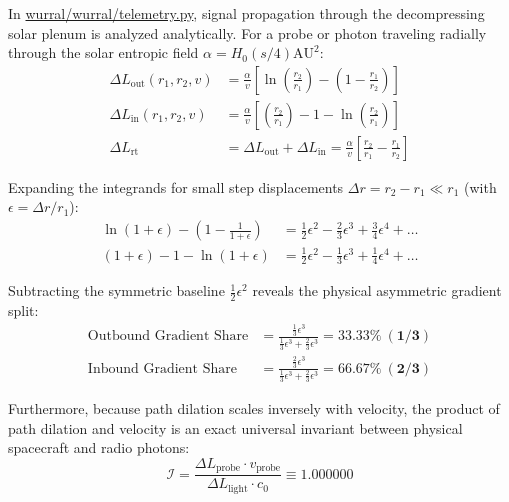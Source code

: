 \documentclass[11pt,a4paper]{article}
\begin{document}
In \url{wurral/wurral/telemetry.py}, signal propagation through the decompressing solar plenum is analyzed analytically. For a probe or photon traveling radially through the solar entropic field $\alpha = H_0 (s/4) \text{AU}^2$:
\begin{align}
\Delta L_{\text{out}}(r_1, r_2, v) &= \frac{\alpha}{v} \left[ \ln\left(\frac{r_2}{r_1}\right) - \left(1 - \frac{r_1}{r_2}\right) \right] \label{eq:l_out} \\
\Delta L_{\text{in}}(r_1, r_2, v) &= \frac{\alpha}{v} \left[ \left(\frac{r_2}{r_1}\right) - 1 - \ln\left(\frac{r_2}{r_1}\right) \right] \label{eq:l_in} \\
\Delta L_{\text{rt}} &= \Delta L_{\text{out}} + \Delta L_{\text{in}} = \frac{\alpha}{v} \left[ \frac{r_2}{r_1} - \frac{r_1}{r_2} \right] \label{eq:l_rt}
\end{align}

Expanding the integrands for small step displacements $\Delta r = r_2 - r_1 \ll r_1$ (with $\epsilon = \Delta r / r_1$):
\begin{align}
\ln(1 + \epsilon) - \left(1 - \frac{1}{1 + \epsilon}\right) &= \frac{1}{2}\epsilon^2 - \frac{2}{3}\epsilon^3 + \frac{3}{4}\epsilon^4 + \dots \\
(1 + \epsilon) - 1 - \ln(1 + \epsilon) &= \frac{1}{2}\epsilon^2 - \frac{1}{3}\epsilon^3 + \frac{1}{4}\epsilon^4 + \dots
\end{align}

Subtracting the symmetric baseline $\frac{1}{2}\epsilon^2$ reveals the physical asymmetric gradient split:
\begin{align}
\text{Outbound Gradient Share} &= \frac{\frac{1}{3}\epsilon^3}{\frac{1}{3}\epsilon^3 + \frac{2}{3}\epsilon^3} = \mathbf{33.33\% \ (1/3)} \label{eq:outbound_share} \\
\text{Inbound Gradient Share} &= \frac{\frac{2}{3}\epsilon^3}{\frac{1}{3}\epsilon^3 + \frac{2}{3}\epsilon^3} = \mathbf{66.67\% \ (2/3)} \label{eq:inbound_share}
\end{align}

Furthermore, because path dilation scales inversely with velocity, the product of path dilation and velocity is an exact universal invariant between physical spacecraft and radio photons:
\begin{equation}
\mathcal{I} = \frac{\Delta L_{\text{probe}} \cdot v_{\text{probe}}}{\Delta L_{\text{light}} \cdot c_0} \equiv \mathbf{1.000000}
\label{eq:speed_invariant}
\end{equation}
\end{document}
